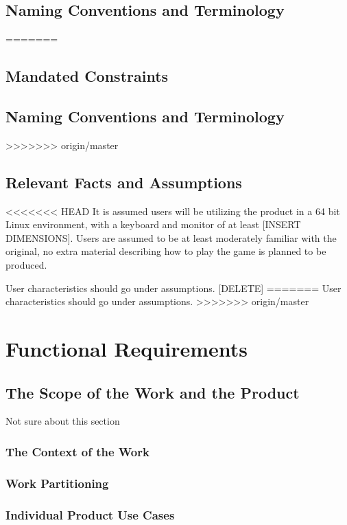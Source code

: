 \documentclass[12pt, titlepage]{article}
\begin{document}
\subsection{Naming Conventions and Terminology}
=======
	\subsection{Mandated Constraints}

	\subsection{Naming Conventions and Terminology}
>>>>>>> origin/master

	\subsection{Relevant Facts and Assumptions}

<<<<<<< HEAD
It is assumed users will be utilizing the product in a 64 bit Linux environment, with a keyboard and monitor of at least [INSERT DIMENSIONS]. Users are assumed to be at least moderately familiar with the original, no extra material describing how to play the game is planned to be produced.

User characteristics should go under assumptions. [DELETE]
=======
	User characteristics should go under assumptions.
>>>>>>> origin/master

\section{Functional Requirements}

	\subsection{The Scope of the Work and the Product}

		Not sure about this section

		\subsubsection{The Context of the Work}

		\subsubsection{Work Partitioning}

		\subsubsection{Individual Product Use Cases}
\end{document}
